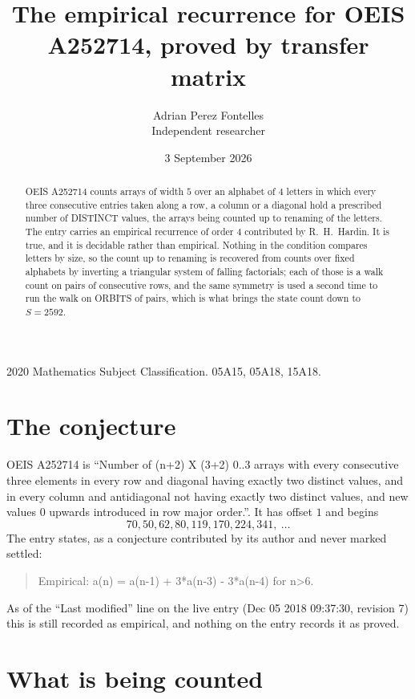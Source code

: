 \documentclass[11pt,a4paper]{article}
\title{The empirical recurrence for OEIS A252714, proved by transfer matrix}
\author{Adrian Perez Fontelles\\ \small Independent researcher}
\date{3 September 2026}
\theoremstyle{plain}
\theoremstyle{definition}
\begin{document}
\maketitle

\begin{abstract}
OEIS A252714 counts arrays of width $5$ over an alphabet of $4$ letters in which every three
consecutive entries taken along a row, a column or a diagonal hold a prescribed number of
DISTINCT values, the arrays being counted up to renaming of the letters. The entry carries an
empirical recurrence of order $4$ contributed by R.~H.~Hardin. It is true, and it is
decidable rather than empirical. Nothing in the condition compares letters by size, so the
count up to renaming is recovered from counts over fixed alphabets by inverting a triangular
system of falling factorials; each of those is a walk count on pairs of consecutive rows, and
the same symmetry is used a second time to run the walk on ORBITS of pairs, which is what
brings the state count down to $S=2592$.
\end{abstract}

\noindent\small 2020 Mathematics Subject Classification. 05A15, 05A18, 15A18.\normalsize

\section{The conjecture}

OEIS A252714 is ``Number of (n+2) X (3+2) 0..3 arrays with every consecutive three elements in every row and diagonal having exactly two distinct values, and in every column and antidiagonal not having exactly two distinct values, and new values 0 upwards introduced in row major order.''. It has offset $1$ and begins
\[
70, 50, 62, 80, 119, 170, 224, 341,\ \dots
\]
The entry states, as a conjecture contributed by its author and never marked settled:
\begin{quote}
Empirical: a(n) = a(n-1) + 3*a(n-3) - 3*a(n-4) for n>6.
\end{quote}
As of the ``Last modified'' line on the live entry (Dec 05 2018 09:37:30, revision 7) this is still
recorded as empirical, and nothing on the entry records it as proved.

\section{What is being counted}
\end{document}
